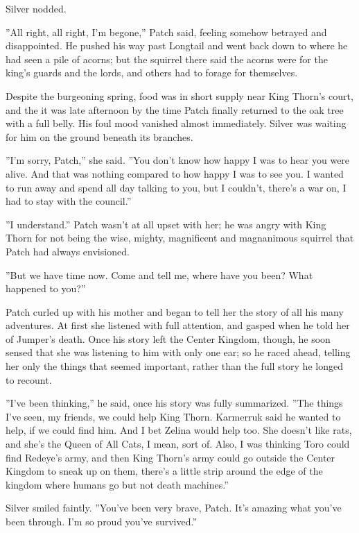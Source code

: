 \documentclass[12pt]{book}
\begin{document}
 Silver nodded.\par
 ''All right, all right, I'm begone,'' Patch said, feeling somehow betrayed and disappointed. He pushed his way past Longtail and went back down to where he had seen a pile of acorns; but the squirrel there said the acorns were for the king's guards and the lords, and others had to forage for themselves.\par
 Despite the burgeoning spring, food was in short supply near King Thorn's court, and the it was late afternoon by the time Patch finally returned to the oak tree with a full belly. His foul mood vanished almost immediately. Silver was waiting for him on the ground beneath its branches.\par
 ''I'm sorry, Patch,'' she said. ''You don't know how happy I was to hear you were alive. And that was nothing compared to how happy I was to see you. I wanted to run away and spend all day talking to you, but I couldn't, there's a war on, I had to stay with the council.''\par
 ''I understand.'' Patch wasn't at all upset with her; he was angry with King Thorn for not being the wise, mighty, magnificent and magnanimous squirrel that Patch had always envisioned.\par
 ''But we have time now. Come and tell me, where have you been? What happened to you?''\par
 Patch curled up with his mother and began to tell her the story of all his many adventures. At first she listened with full attention, and gasped when he told her of Jumper's death. Once his story left the Center Kingdom, though, he soon sensed that she was listening to him with only one ear; so he raced ahead, telling her only the things that seemed important, rather than the full story he longed to recount.\par
 ''I've been thinking,'' he said, once his story was fully summarized. ''The things I've seen, my friends, we could help King Thorn. Karmerruk said he wanted to help, if we could find him. And I bet Zelina would help too. She doesn't like rats, and she's the Queen of All Cats, I mean, sort of. Also, I was thinking Toro could find Redeye's army, and then King Thorn's army could go outside the Center Kingdom to sneak up on them, there's a little strip around the edge of the kingdom where humans go but not death machines.''\par
 Silver smiled faintly. ''You've been very brave, Patch. It's amazing what you've been through. I'm so proud you've survived.''\par
\end{document}
